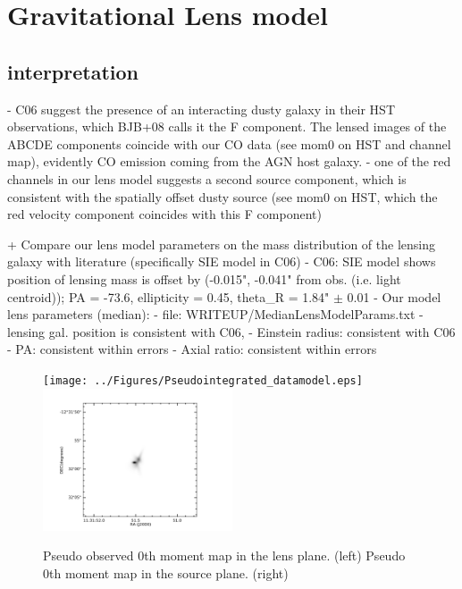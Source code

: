 \documentclass[]{emulateapj}
\begin{document}
\author{Draft}


\section{Gravitational Lens model}

\subsection{interpretation}
- C06 suggest the presence of an interacting dusty galaxy in their HST
observations, which BJB+08 calls it the F component. The lensed images of the
ABCDE 
components coincide with our CO data (see mom0 on HST and channel map),
evidently CO emission coming from the AGN host galaxy. 
- one of the red channels in our lens model suggests a second source component,
which is consistent with the spatially offset dusty source (see mom0 on HST,
which 
the red velocity component coincides with this F component)

+ Compare our lens model parameters on the mass distribution of the lensing
galaxy with literature (specifically SIE model in C06)
	- C06: SIE model shows position of lensing mass is offset by (-0.015",
-0.041" from obs. (i.e. light centroid)); PA = -73.6, ellipticity = 0.45,
theta\_R = 1.84" $\pm$ 0.01 
	- Our model lens parameters (median):
		- file: WRITEUP/MedianLensModelParams.txt
		- lensing gal. position is consistent with C06, 
		- Einstein radius: consistent with C06
		- PA: consistent within errors
		- Axial ratio: consistent within errors



\begin{figure}[tbph]
\centering
\texttt{[image: ../Figures/Pseudointegrated\_datamodel.eps]}
\includegraphics[width=0.50\textwidth]{../Figures/SourcesPlane.png}
\caption{
Pseudo observed 0th moment map in the lens plane. (left)
Pseudo 0th moment map in the source plane. (right)
\label{fig:}}
\end{figure}
\end{document}
